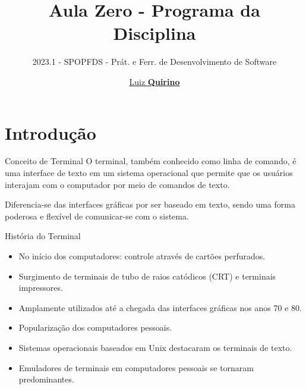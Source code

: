 \documentclass{beamer}
\title{Aula Zero - Programa da Disciplina}
\subtitle{2023.1 - SPOPFDS - Prát. e Ferr. de Desenvolvimento de Software}
\author{\href{mailto:luiz.quirino@ifsp.edu.br}{Luiz \textbf{Quirino}}}
\newcommand{\hrefcol}[2]{\textcolor{cyan}{\href{#1}{#2}}}
\begin{document}
\maketitle

%
%



\section{Introdução}
\begin{frame}{Conceito de Terminal}\justifying
      O terminal, também conhecido como linha de comando, é uma interface de texto em um sistema operacional que permite que os usuários interajam com o computador por meio de comandos de texto.
  
      \vspace{0.5cm}
  
      Diferencia-se das interfaces gráficas por ser baseado em texto, sendo uma forma poderosa e flexível de comunicar-se com o sistema.
  \end{frame}
  \begin{frame}{História do Terminal}\justifying
      \begin{itemize}
          \item No início dos computadores: controle através de cartões perfurados.
          \item Surgimento de terminais de tubo de raios catódicos (CRT) e terminais impressores.
          \item Amplamente utilizados até a chegada das interfaces gráficas nos anos 70 e 80.
          \item Popularização dos computadores pessoais.
          \item Sistemas operacionais baseados em Unix destacaram os terminais de texto.
          \item Emuladores de terminais em computadores pessoais se tornaram predominantes.
      \end{itemize}
  \end{frame}
\end{document}
